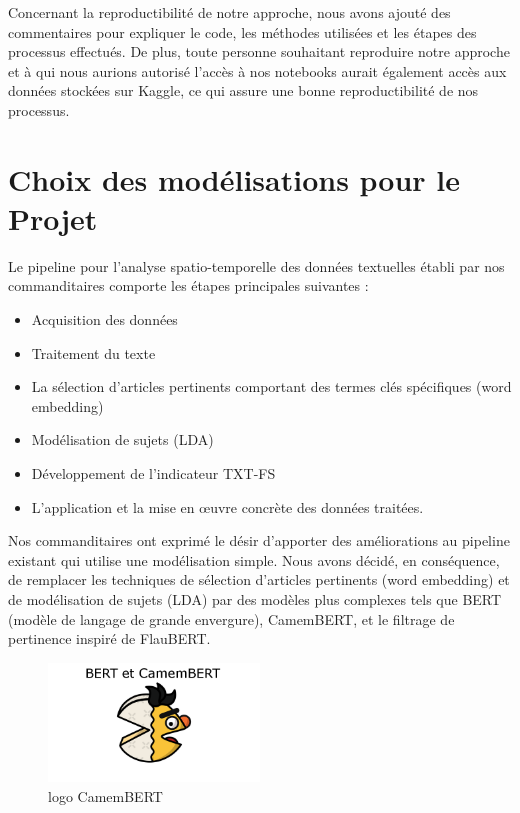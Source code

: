 \documentclass{article}
\begin{document}
Concernant la reproductibilité de notre approche, nous avons ajouté des commentaires pour expliquer le code, les méthodes utilisées et les étapes des processus effectués. De plus, toute personne souhaitant reproduire notre approche et à qui nous aurions autorisé l'accès à nos notebooks aurait également accès aux données stockées sur Kaggle, ce qui assure une bonne reproductibilité de nos processus.

\section{Choix des modélisations pour le Projet}

Le pipeline pour l'analyse spatio-temporelle des données textuelles établi par nos commanditaires comporte les étapes principales suivantes :
\begin{itemize}
    \item Acquisition des données
    \item Traitement du texte
    \item La sélection d'articles pertinents comportant des termes clés spécifiques (word embedding)
    \item Modélisation de sujets (LDA)
    \item Développement de l'indicateur TXT-FS
    \item L'application et la mise en œuvre concrète des données traitées. \\
\end{itemize}

Nos commanditaires ont exprimé le désir d'apporter des améliorations au pipeline existant qui utilise une modélisation simple. Nous avons décidé, en conséquence, de remplacer les techniques de sélection d'articles pertinents (word embedding) et de modélisation de sujets (LDA) par des modèles plus complexes tels que BERT (modèle de langage de grande envergure), CamemBERT, et le filtrage de pertinence inspiré de FlauBERT.
\begin{figure}[h]
    \centering
    \includegraphics[width=0.5\textwidth]{BERT.png}
    \caption{logo CamemBERT}
    \label{fig:CamemBERT}
\end{figure}
\end{document}
